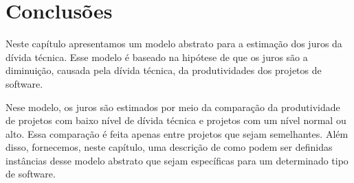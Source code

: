  \section{Conclusões}
 
 Neste capítulo apresentamos um modelo abstrato para a estimação dos juros da dívida técnica. Esse modelo é baseado na hipótese de que os juros são a diminuição, causada pela dívida técnica, da produtividades dos projetos de software. 
 
 Nese modelo, os juros são estimados por meio da comparação da produtividade de projetos com baixo nível de dívida técnica e projetos com um nível normal ou alto. Essa comparação é feita apenas entre projetos que sejam semelhantes. 
Além disso, fornecemos, neste capítulo, uma descrição de como podem ser definidas instâncias desse modelo abstrato que sejam específicas para um determinado tipo de software. 
 
 
 
 




 
 
 